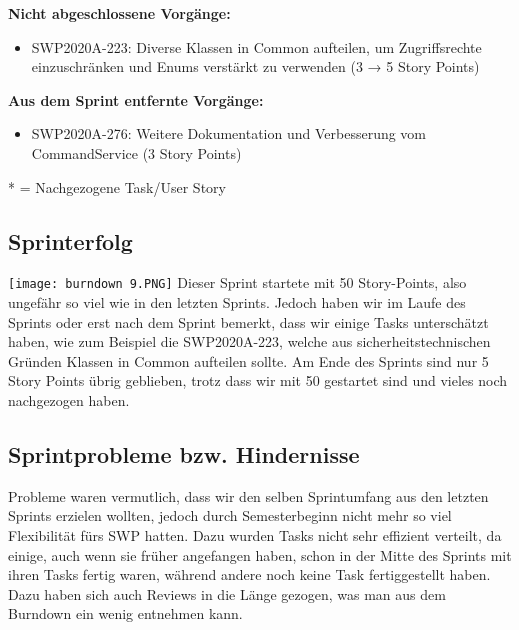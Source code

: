 \documentclass[12pt,a4paper, oneside]{article}
\begin{document}
    \textbf{Nicht abgeschlossene Vorgänge:}
    \begin{itemize}
        \item SWP2020A-223:	Diverse Klassen in Common 		 aufteilen, um Zugriffsrechte einzuschränken und Enums verstärkt zu verwenden (3 → 5 Story Points)
    \end{itemize}

    \textbf{Aus dem Sprint entfernte Vorgänge:}
    \begin{itemize}
        \item SWP2020A-276:	Weitere Dokumentation und Verbesserung vom CommandService (3 Story Points)
    \end{itemize}


    * = Nachgezogene Task/User Story




    \subsection{Sprinterfolg}
    \texttt{[image: burndown 9.PNG]}
    Dieser Sprint startete mit 50 Story-Points, also ungefähr so viel wie in den letzten Sprints. Jedoch haben wir im Laufe des Sprints oder erst nach dem Sprint bemerkt, dass wir einige Tasks unterschätzt haben, wie zum Beispiel die SWP2020A-223, welche aus sicherheitstechnischen Gründen Klassen in Common aufteilen sollte. Am Ende des Sprints sind nur 5 Story Points übrig geblieben, trotz dass wir mit 50 gestartet sind und vieles noch nachgezogen haben.


    \subsection{Sprintprobleme bzw. Hindernisse}
    Probleme waren vermutlich, dass wir den selben Sprintumfang aus den letzten Sprints erzielen wollten, jedoch durch Semesterbeginn nicht mehr so viel Flexibilität fürs SWP hatten. Dazu wurden Tasks nicht sehr effizient verteilt, da einige, auch wenn sie früher angefangen haben, schon in der Mitte des Sprints mit ihren Tasks fertig waren, während andere noch keine Task fertiggestellt haben. Dazu haben sich auch Reviews in die Länge gezogen, was man aus dem Burndown ein wenig entnehmen kann.
\end{document}

